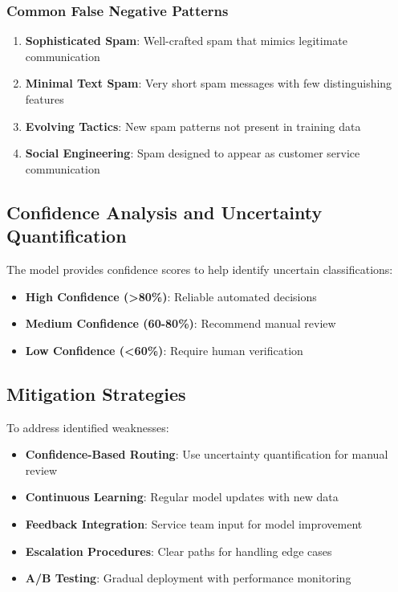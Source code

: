 \documentclass[12pt,a4paper]{article}
\begin{document}
\subsubsection{Common False Negative Patterns}

\begin{enumerate}
    \item \textbf{Sophisticated Spam}: Well-crafted spam that mimics legitimate communication
    \item \textbf{Minimal Text Spam}: Very short spam messages with few distinguishing features
    \item \textbf{Evolving Tactics}: New spam patterns not present in training data
    \item \textbf{Social Engineering}: Spam designed to appear as customer service communication
\end{enumerate}

\subsection{Confidence Analysis and Uncertainty Quantification}

The model provides confidence scores to help identify uncertain classifications:

\begin{itemize}
    \item \textbf{High Confidence (>80\%)}: Reliable automated decisions
    \item \textbf{Medium Confidence (60-80\%)}: Recommend manual review
    \item \textbf{Low Confidence (<60\%)}: Require human verification
\end{itemize}

\subsection{Mitigation Strategies}

To address identified weaknesses:

\begin{itemize}
    \item \textbf{Confidence-Based Routing}: Use uncertainty quantification for manual review
    \item \textbf{Continuous Learning}: Regular model updates with new data
    \item \textbf{Feedback Integration}: Service team input for model improvement
    \item \textbf{Escalation Procedures}: Clear paths for handling edge cases
    \item \textbf{A/B Testing}: Gradual deployment with performance monitoring
\end{itemize}
\end{document}

